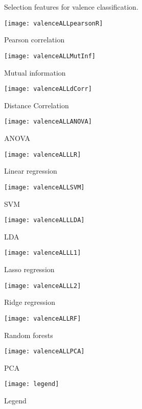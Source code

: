 \clearpage

\begin{figure}[!tbp]
  \centering
  \caption{Selection features for valence classification.\label{valencepies}}
  \begin{minipage}[b]{0.3\textwidth}
    \texttt{[image: valenceALLpearsonR]}
    \caption{Pearson correlation}
  \end{minipage}
  \hfill
  \begin{minipage}[b]{0.3\textwidth}
    \texttt{[image: valenceALLMutInf]}
    \caption{Mutual information}
  \end{minipage}
  \hfill
  \begin{minipage}[b]{0.3\textwidth}
    \texttt{[image: valenceALLdCorr]}
    \caption{Distance Correlation}
  \end{minipage}
  
  \begin{minipage}[b]{0.3\textwidth}
    \texttt{[image: valenceALLANOVA]}
    \caption{ANOVA}
  \end{minipage}
  \hfill
  \begin{minipage}[b]{0.3\textwidth}
    \texttt{[image: valenceALLLR]}
    \caption{Linear regression}
  \end{minipage}
  \hfill
  \begin{minipage}[b]{0.3\textwidth}
    \texttt{[image: valenceALLSVM]}
    \caption{SVM}
  \end{minipage}
  
  \begin{minipage}[b]{0.3\textwidth}
    \texttt{[image: valenceALLLDA]}
    \caption{LDA}
  \end{minipage}
  \hfill
  \begin{minipage}[b]{0.3\textwidth}
    \texttt{[image: valenceALLL1]}
    \caption{Lasso regression}
  \end{minipage}
  \hfill
  \begin{minipage}[b]{0.3\textwidth}
    \texttt{[image: valenceALLL2]}
    \caption{Ridge regression}
  \end{minipage}
  
  \begin{minipage}[b]{0.3\textwidth}
    \texttt{[image: valenceALLRF]}
    \caption{Random forests}
  \end{minipage}
  \hfill
  \begin{minipage}[b]{0.3\textwidth}
    \texttt{[image: valenceALLPCA]} %
    \caption{PCA}
  \end{minipage}
  \hfill
  \begin{minipage}[b]{0.3\textwidth}
    \texttt{[image: legend]}
    \caption{Legend\label{valencepieslegend}}
  \end{minipage}
\end{figure}
\clearpage

